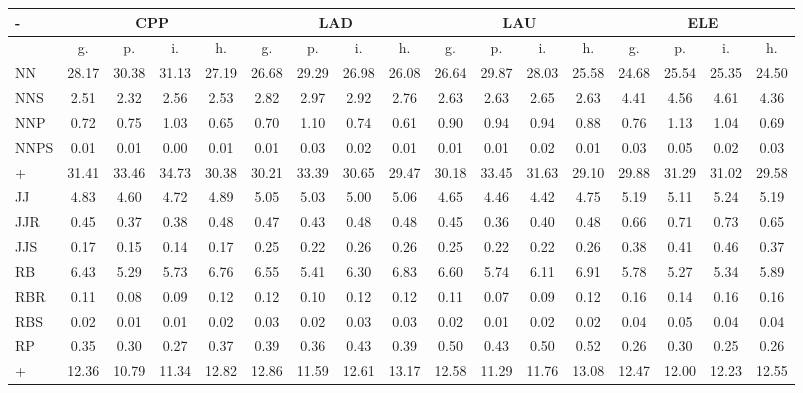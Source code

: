 \documentclass[%
 aip,
 jmp,%
 amsmath,amssymb,
 reprint,%
 floatfix,
]{revtex4-1}
\begin{document}
\renewcommand{\arraystretch}{1.3}
\begin{table}
  \centering
    \small
\setlength{\tabcolsep}{.26667em}
  \begin{tabular}{|l|| c|c|c|c||  c|c|c|c||   c|c|c|c||   c|c|c|c|}\hline
-\-  & \multicolumn{4}{c|}{CPP} & \multicolumn{4}{c|}{LAD} & \multicolumn{4}{c|}{LAU} & \multicolumn{4}{c|}{ELE} \\ \hline
 & g. & p. & i. & h. &     g. & p. & i. & h. &    g. & p. & i. & h. &    g. & p. & i. & h. \\\hline
NN & 28.17 & 30.38 & 31.13 & 27.19 & 26.68 & 29.29 & 26.98 & 26.08 & 26.64 & 29.87 & 28.03 & 25.58 & 24.68 & 25.54 & 25.35 & 24.50\\
NNS & 2.51 & 2.32 & 2.56 & 2.53 & 2.82 & 2.97 & 2.92 & 2.76 & 2.63 & 2.63 & 2.65 & 2.63 & 4.41 & 4.56 & 4.61 & 4.36\\
NNP & 0.72 & 0.75 & 1.03 & 0.65 & 0.70 & 1.10 & 0.74 & 0.61 & 0.90 & 0.94 & 0.94 & 0.88 & 0.76 & 1.13 & 1.04 & 0.69\\
NNPS & 0.01 & 0.01 & 0.00 & 0.01 & 0.01 & 0.03 & 0.02 & 0.01 & 0.01 & 0.01 & 0.02 & 0.01 & 0.03 & 0.05 & 0.02 & 0.03\\\hline
+ & 31.41 & 33.46 & 34.73 & 30.38 & 30.21 & 33.39 & 30.65 & 29.47 & 30.18 & 33.45 & 31.63 & 29.10 & 29.88 & 31.29 & 31.02 & 29.58\\\hline\hline
JJ & 4.83 & 4.60 & 4.72 & 4.89 & 5.05 & 5.03 & 5.00 & 5.06 & 4.65 & 4.46 & 4.42 & 4.75 & 5.19 & 5.11 & 5.24 & 5.19\\
JJR & 0.45 & 0.37 & 0.38 & 0.48 & 0.47 & 0.43 & 0.48 & 0.48 & 0.45 & 0.36 & 0.40 & 0.48 & 0.66 & 0.71 & 0.73 & 0.65\\
JJS & 0.17 & 0.15 & 0.14 & 0.17 & 0.25 & 0.22 & 0.26 & 0.26 & 0.25 & 0.22 & 0.22 & 0.26 & 0.38 & 0.41 & 0.46 & 0.37\\
RB & 6.43 & 5.29 & 5.73 & 6.76 & 6.55 & 5.41 & 6.30 & 6.83 & 6.60 & 5.74 & 6.11 & 6.91 & 5.78 & 5.27 & 5.34 & 5.89\\
RBR & 0.11 & 0.08 & 0.09 & 0.12 & 0.12 & 0.10 & 0.12 & 0.12 & 0.11 & 0.07 & 0.09 & 0.12 & 0.16 & 0.14 & 0.16 & 0.16\\
RBS & 0.02 & 0.01 & 0.01 & 0.02 & 0.03 & 0.02 & 0.03 & 0.03 & 0.02 & 0.01 & 0.02 & 0.02 & 0.04 & 0.05 & 0.04 & 0.04\\
RP & 0.35 & 0.30 & 0.27 & 0.37 & 0.39 & 0.36 & 0.43 & 0.39 & 0.50 & 0.43 & 0.50 & 0.52 & 0.26 & 0.30 & 0.25 & 0.26\\\hline
+ & 12.36 & 10.79 & 11.34 & 12.82 & 12.86 & 11.59 & 12.61 & 13.17 & 12.58 & 11.29 & 11.76 & 13.08 & 12.47 & 12.00 & 12.23 & 12.55\\\hline\hline

\end{tabular}
\end{table}
\end{document}
